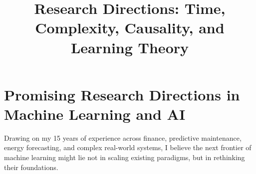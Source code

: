 

\title{Research Directions: Time, Complexity, Causality, and Learning
Theory}
\date{}


  \maketitle

  \section*{Promising Research Directions in Machine Learning and AI}

  Drawing on my 15 years of experience across finance, predictive
  maintenance, energy forecasting, and complex real-world systems, I believe
  the next frontier of machine learning might lie not in scaling existing
  paradigms, but in rethinking their foundations.

